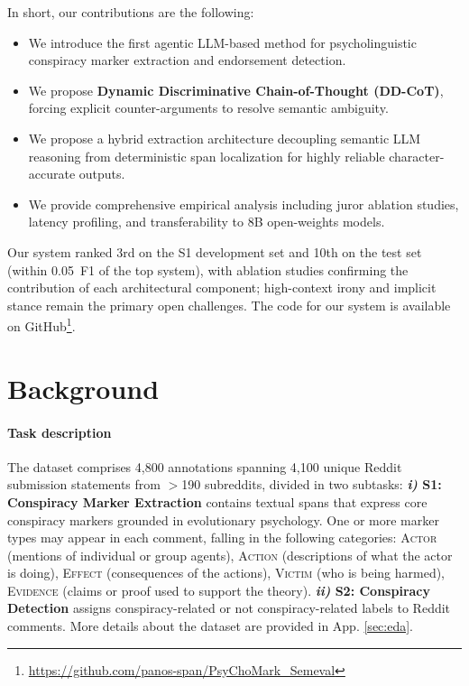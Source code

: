 \documentclass[11pt]{article}
\begin{document}
In short, our contributions are the following:
\begin{itemize}
	\item We introduce the first agentic LLM-based method for psycholinguistic conspiracy
	      marker extraction and endorsement detection.
	\item We propose \textbf{Dynamic Discriminative Chain-of-Thought (DD-CoT)},
	      forcing explicit counter-arguments to resolve semantic ambiguity.
	\item We propose a hybrid extraction architecture decoupling semantic LLM reasoning
	      from deterministic span localization for highly reliable character-accurate outputs.
	\item We provide comprehensive empirical analysis including juror ablation studies,
	      latency profiling, and transferability to 8B open-weights models.
\end{itemize}


Our system ranked 3rd on the S1 development set and 10th on the test set (within 0.05~F1 of the top system), with ablation studies confirming the contribution of each architectural component; high-context irony and implicit stance remain the primary open challenges.
The code for our system is available on GitHub\footnote{\url{https://github.com/panos-span/PsyChoMark_Semeval}}.

\section{Background}
\paragraph{Task description}
The dataset comprises 4,800 annotations spanning 4,100 unique Reddit submission
statements from $>$190 subreddits, divided in two subtasks: \textbf{\textit{i)}
    S1: Conspiracy Marker Extraction} contains textual spans that express core
conspiracy markers grounded in evolutionary psychology. One or more marker
types may appear in each comment, falling in the following categories:
\textsc{Actor} (mentions of individual or group agents), \textsc{Action}
(descriptions of what the actor is doing), \textsc{Effect} (consequences of the
actions), \textsc{Victim} (who is being harmed), \textsc{Evidence} (claims or
proof used to support the theory). \textbf{\textit{ii)} S2: Conspiracy
    Detection} assigns conspiracy-related or not conspiracy-related labels to
Reddit comments. More details about the dataset are provided in App.
\ref{sec:eda}.
\end{document}
